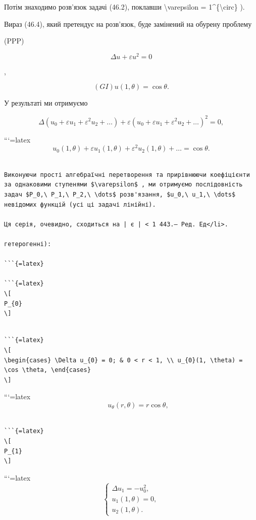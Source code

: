 \documentclass[
]{article}
\begin{document}
Потім знаходимо розв'язок задачі (46.2), поклавши
\textbackslash varepsilon = 1\^{}\{\textbackslash circ\} ).

Вираз (46.4), який претендує на розв'язок, буде замінений на обурену
проблему

(PPP)

\[
\Delta u + \varepsilon u^2 = 0
\]

,

\[
(GI) u(1, \theta) = \cos \theta .
\]

У результаті ми отримуємо

\[
\Delta (u_0 + \varepsilon u_1 + \varepsilon^2 u_2 + \ldots) + \varepsilon (u_0 + \varepsilon u_1 + \varepsilon^2 u_2 + \ldots)^2 = 0,
\]

```{=latex}
\[
u_0 (1, \theta) + \varepsilon u_1 (1, \theta) + \varepsilon^2 u_2 (1, \theta) + \ldots = \cos \theta.
\]

\begin{verbatim}

Виконуючи прості алгебраїчні перетворення та прирівнюючи коефіцієнти за однаковими ступенями $\varepsilon$ , ми отримуємо послідовність задач $P_0,\ P_1,\ P_2,\ \dots$ розв'язання, $u_0,\ u_1,\ \dots$ невідомих функцій (усі ці задачі лінійні).

Ця серія, очевидно, сходиться на | є | < 1 443.— Ред. Ед</li>.

гетерогенні):

```{=latex}

```{=latex}
\[
P_{0}
\]
\end{verbatim}

\begin{verbatim}

```{=latex}
\[
\begin{cases} \Delta u_{0} = 0; & 0 < r < 1, \\ u_{0}(1, \theta) = \cos \theta, \end{cases}
\]
\end{verbatim}

```{=latex}
\[
\qquad u_{\theta}(r, \theta) = r \cos \theta,
\]

\begin{verbatim}

```{=latex}
\[
P_{1}
\]
\end{verbatim}

```{=latex}
\[
\begin{cases} \Delta u_{1} = -u_{0}^{2}, \\ u_{1}(1, \theta) = 0, \\ u_{2}(1, \theta). \end{cases}
\]
\end{document}
